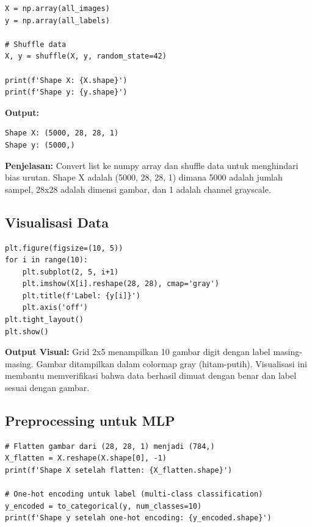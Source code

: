 \documentclass[12pt,a4paper]{article}
\begin{document}
\begin{lstlisting}[caption=Convert ke Array dan Shuffle]
X = np.array(all_images)
y = np.array(all_labels)

# Shuffle data
X, y = shuffle(X, y, random_state=42)

print(f'Shape X: {X.shape}')
print(f'Shape y: {y.shape}')
\end{lstlisting}

\textbf{Output:}
\begin{verbatim}
Shape X: (5000, 28, 28, 1)
Shape y: (5000,)
\end{verbatim}

\textbf{Penjelasan:} Convert list ke numpy array dan shuffle data untuk menghindari bias urutan. Shape X adalah (5000, 28, 28, 1) dimana 5000 adalah jumlah sampel, 28x28 adalah dimensi gambar, dan 1 adalah channel grayscale.

\subsection{Visualisasi Data}

\begin{lstlisting}[caption=Visualisasi 10 Gambar Contoh]
plt.figure(figsize=(10, 5))
for i in range(10):
    plt.subplot(2, 5, i+1)
    plt.imshow(X[i].reshape(28, 28), cmap='gray')
    plt.title(f'Label: {y[i]}')
    plt.axis('off')
plt.tight_layout()
plt.show()
\end{lstlisting}

\textbf{Output Visual:} Grid 2x5 menampilkan 10 gambar digit dengan label masing-masing. Gambar ditampilkan dalam colormap gray (hitam-putih). Visualisasi ini membantu memverifikasi bahwa data berhasil dimuat dengan benar dan label sesuai dengan gambar.

\subsection{Preprocessing untuk MLP}

\begin{lstlisting}[caption=Flatten dan One-Hot Encoding]
# Flatten gambar dari (28, 28, 1) menjadi (784,)
X_flatten = X.reshape(X.shape[0], -1)
print(f'Shape X setelah flatten: {X_flatten.shape}')

# One-hot encoding untuk label (multi-class classification)
y_encoded = to_categorical(y, num_classes=10)
print(f'Shape y setelah one-hot encoding: {y_encoded.shape}')
\end{lstlisting}
\end{document}
